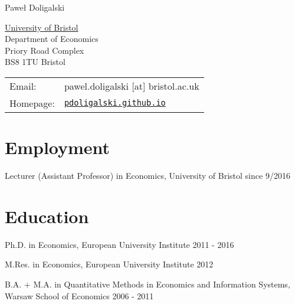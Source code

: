 \documentclass[letterpaper]{article}
\def\name{Pawe\l{} Doligalski}
\renewenvironment{itemize}{
  \begin{list}{}{
    \setlength{\leftmargin}{1.5em}
  }
}{
  \end{list}
}
\begin{document}
{\huge \name}


\vspace{0.25in}

\begin{minipage}{0.45\linewidth}
  \href{http://www.unc.edu/}{University of Bristol} \\
  Department of Economics \\
  Priory Road Complex \\
  BS8 1TU Bristol
\end{minipage}
\begin{minipage}{0.45\linewidth}
  \begin{tabular}{ll}
    Email: & pawel.doligalski [at] bristol.ac.uk \\
    Homepage: & \href{http://pdoligalski.github.io}{\tt pdoligalski.github.io} \\
  \end{tabular}
\end{minipage}

\section*{Employment}

\begin{itemize}
\item Lecturer (Assistant Professor) in Economics, University of Bristol \hfill since 9/2016
\end{itemize}


\section*{Education}

\begin{itemize}
  \item Ph.D. in Economics, European University Institute \hfill 2011 - 2016

  \item M.Res. in Economics, European University Institute \hfill 2012

  \item{B.A. + M.A. in Quantitative Methods in Economics and Information Systems,\\
   \indent \hspace{8cm} Warsaw School of Economics \hfill 2006 - 2011}


\end{itemize}
\end{document}
